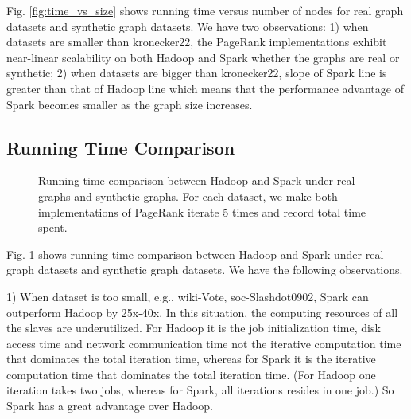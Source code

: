 \documentclass[12pt,conference,letterpaper]{IEEEtran}
\begin{document}
Fig. \ref{fig:time_vs_size} shows running time versus number of nodes for real graph datasets and synthetic graph datasets. We have two observations: 1) when datasets are smaller than kronecker22, the PageRank implementations exhibit near-linear scalability on both Hadoop and Spark whether the graphs are real or synthetic; 2) when datasets are bigger than kronecker22, slope of Spark line is greater than that of Hadoop line which means that the performance advantage of Spark becomes smaller as the graph size increases.

\subsection{Running Time Comparison}

\begin{figure}[!t]
\centering
{}
\caption{Running time comparison between Hadoop and Spark under real graphs and synthetic graphs. For each dataset, we make both implementations of PageRank iterate 5 times and record total time spent.}
\label{fig:hadoopsparkrunningtime}
\end{figure}

Fig. \ref{fig:hadoopsparkrunningtime} shows running time comparison between Hadoop and Spark under real graph datasets and synthetic graph datasets. We have the following observations. 

1) When dataset is too small, e.g., wiki-Vote, soc-Slashdot0902, Spark can outperform Hadoop by 25x-40x. In this situation, the computing resources of all the slaves are underutilized. For Hadoop it is the job initialization time, disk access time and network communication time not the iterative computation time that dominates the total iteration time, whereas for Spark it is the iterative computation time that dominates the total iteration time. (For Hadoop one iteration takes two jobs, whereas for Spark, all iterations resides in one job.) So Spark has a great advantage over Hadoop.
\end{document}
